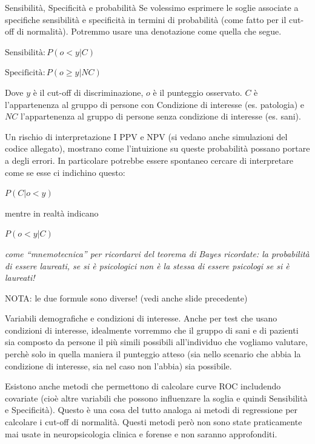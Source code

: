 \documentclass[
  ignorenonframetext,
  aspectratio=169,
]{beamer}
\begin{document}
\begin{frame}{Sensibilità, Specificità e probabilità}
\label{sensibilituxe0-specificituxe0-e-probabilituxe0}
Se volessimo esprimere le soglie associate a specifiche sensibilità e
specificità in termini di probabilità (come fatto per il cut-off di
normalità). Potremmo usare una denotazione come quella che segue.

\(\text{Sensibilità}: P(o < y | C)\)

\(\text{Specificità}: P(o \geq  y | NC)\)

Dove \(y\) è il cut-off di discriminazione, \(o\) è il punteggio
osservato. \(C\) è l'appartenenza al gruppo di persone con Condizione di
interesse (es. patologia) e \(NC\) l'appartenenza al gruppo di persone
senza condizione di interesse (es. sani).
\end{frame}

\begin{frame}{Un rischio di interpretazione}
\label{un-rischio-di-interpretazione}
I PPV e NPV (si vedano anche simulazioni del codice allegato), mostrano
come l'intuizione su queste probabilità possano portare a degli errori.
In particolare potrebbe essere spontaneo cercare di interpretare come se
esse ci indichino questo:

\(P(C | o < y)\)

mentre in realtà indicano

\(P(o < y | C)\)

\pause

\emph{come ``mnemotecnica'' per ricordarvi del teorema di Bayes
ricordate: la probabilità di essere laureati, se si è psicologici non è
la stessa di essere psicologi se si è laureati!}

NOTA: le due formule sono diverse! (vedi anche slide precedente)
\end{frame}

\begin{frame}{Variabili demografiche e condizioni di interesse.}
\label{variabili-demografiche-e-condizioni-di-interesse.}
Anche per test che usano condizioni di interesse, idealmente vorremmo
che il gruppo di sani e di pazienti sia composto da persone il più
simili possibili all'individuo che vogliamo valutare, perchè solo in
quella maniera il punteggio atteso (sia nello scenario che abbia la
condizione di interesse, sia nel caso non l'abbia) sia possibile.

Esistono anche metodi che permettono di calcolare curve ROC includendo
covariate (cioè altre variabili che possono influenzare la soglia e
quindi Sensibilità e Specificità). Questo è una cosa del tutto analoga
ai metodi di regressione per calcolare i cut-off di normalità. Questi
metodi però non sono state praticamente mai usate in neuropsicologia
clinica e forense e non saranno approfonditi.
\end{frame}
\end{document}

